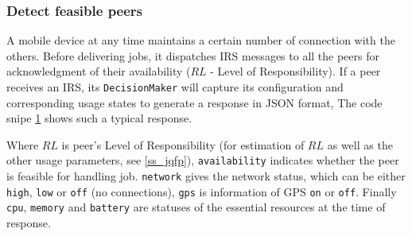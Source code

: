 \documentclass[conference]{IEEEtran}
\begin{document}
\subsubsection{Detect feasible peers}\label{ss_dfp}

A mobile device at any time maintains a certain number of connection with the others. Before delivering jobs, it dispatches IRS messages to all the peers for acknowledgment of their availability ($RL$ - Level of Responsibility). If a peer receives an IRS, its \texttt{DecisionMaker} will capture its configuration and corresponding usage states to generate a response in JSON format, The code snipe \ref{code:jsonResponse} shows such a typical response.\\

\begin{figure}
\noindent {}	
\noindent {}	

\label{code:jsonResponse}

\end{figure}

Where $RL$ is peer's Level of Responsibility (for estimation of $RL$ as well as the other usage parameters, see \ref{ss_jqfp}), \texttt{availability} indicates whether the peer is feasible for handling job. \texttt{network} gives the network status, which can be either \texttt{high}, \texttt{low} or \texttt{off} (no connections), \texttt{gps} is information of GPS \texttt{on} or \texttt{off}. Finally \texttt{cpu}, \texttt{memory} and \texttt{battery} are statuses of the essential resources at the time of response. 
\end{document}
